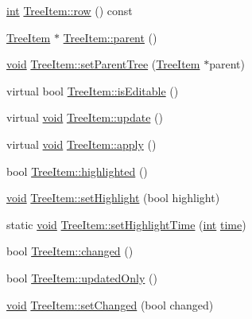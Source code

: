\begin{DoxyCompactItemize}
\item 
\hyperlink{ioapi_8h_a787fa3cf048117ba7123753c1e74fcd6}{int} \hyperlink{group___u_a_v_object_browser_plugin_ga5a062d24b35421360ad1d101c564e9be}{Tree\-Item\-::row} () const 
\item 
\hyperlink{class_tree_item}{Tree\-Item} $\ast$ \hyperlink{group___u_a_v_object_browser_plugin_gaa3a7ba624312b6be70872634db291881}{Tree\-Item\-::parent} ()
\item 
\hyperlink{group___u_a_v_objects_plugin_ga444cf2ff3f0ecbe028adce838d373f5c}{void} \hyperlink{group___u_a_v_object_browser_plugin_gab0eb64f28a5cd5d9e77ff4579014b1bb}{Tree\-Item\-::set\-Parent\-Tree} (\hyperlink{class_tree_item}{Tree\-Item} $\ast$parent)
\item 
virtual bool \hyperlink{group___u_a_v_object_browser_plugin_ga6d83a2fdf1599b2be263c94ad5b05e83}{Tree\-Item\-::is\-Editable} ()
\item 
virtual \hyperlink{group___u_a_v_objects_plugin_ga444cf2ff3f0ecbe028adce838d373f5c}{void} \hyperlink{group___u_a_v_object_browser_plugin_gab6c763d5ea39c359ab56b4d8b1af8f7b}{Tree\-Item\-::update} ()
\item 
virtual \hyperlink{group___u_a_v_objects_plugin_ga444cf2ff3f0ecbe028adce838d373f5c}{void} \hyperlink{group___u_a_v_object_browser_plugin_gaca25a01ba924019208f39d7c7ae2f593}{Tree\-Item\-::apply} ()
\item 
bool \hyperlink{group___u_a_v_object_browser_plugin_ga47c7c59b2ed66695e9c42351fbeb24b2}{Tree\-Item\-::highlighted} ()
\item 
\hyperlink{group___u_a_v_objects_plugin_ga444cf2ff3f0ecbe028adce838d373f5c}{void} \hyperlink{group___u_a_v_object_browser_plugin_ga59e306591cb8099a247f47cde3e4e78a}{Tree\-Item\-::set\-Highlight} (bool highlight)
\item 
static \hyperlink{group___u_a_v_objects_plugin_ga444cf2ff3f0ecbe028adce838d373f5c}{void} \hyperlink{group___u_a_v_object_browser_plugin_ga75de400d0bd7ba687fcc1535a3a0f871}{Tree\-Item\-::set\-Highlight\-Time} (\hyperlink{ioapi_8h_a787fa3cf048117ba7123753c1e74fcd6}{int} \hyperlink{analyze_raw_8m_a70c092a6aebace0b1ea406e14da78a40}{time})
\item 
bool \hyperlink{group___u_a_v_object_browser_plugin_ga092f37d4eb04a9889985eadb5066ff6e}{Tree\-Item\-::changed} ()
\item 
bool \hyperlink{group___u_a_v_object_browser_plugin_gae407428df05b1f28bcb6e8bf2cd86b73}{Tree\-Item\-::updated\-Only} ()
\item 
\hyperlink{group___u_a_v_objects_plugin_ga444cf2ff3f0ecbe028adce838d373f5c}{void} \hyperlink{group___u_a_v_object_browser_plugin_ga2562126b279261daaf87d6234bfb807c}{Tree\-Item\-::set\-Changed} (bool changed)

\end{DoxyCompactItemize}
